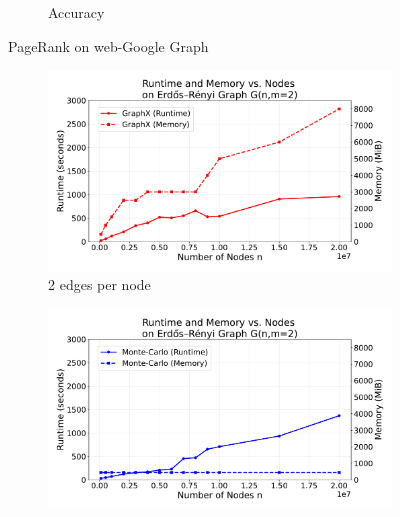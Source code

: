 \begin{figure}[H]
\begin{subfigure}[t]{0.5\linewidth}
        \caption{Accuracy}
        \label{fig:wikigibhrs}
    \end{subfigure}
    \caption{PageRank on web-Google Graph}
    \label{fig:wiki-comparison}
\end{figure}


\begin{figure}[H]
    \centering
    \begin{subfigure}[t]{0.75\linewidth}
        \centering
        \includegraphics[width=\linewidth]{images/plots/ER_2edg/combined_runtime_memory_vs_nodes_2edges_v3.pdf}
        \caption{2 edges per node}
        \label{fig:2run}
    \end{subfigure}\hfill
    \begin{subfigure}[t]{0.75\linewidth}
        \centering
        \includegraphics[width=\linewidth]{images/plots/ER_2edg/combined_runtime_memory_vs_nodes_2edges_mc.pdf}

\end{subfigure}
\end{figure}
